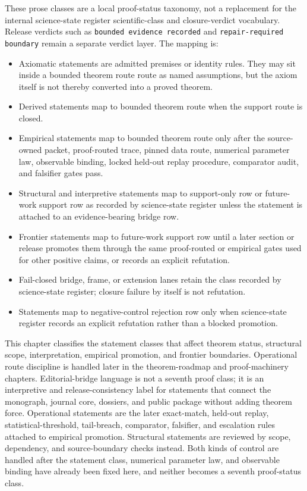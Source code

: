 These prose classes are a local proof-status taxonomy, not a replacement for
the internal science-state register scientific-class and closure-verdict vocabulary. Release
verdicts such as \texttt{bounded evidence recorded} and \texttt{repair-required boundary} remain a separate
verdict layer. The mapping is:
\begin{itemize}
\item Axiomatic statements are admitted premises or identity rules. They may
      sit inside a bounded theorem route route as named assumptions, but
      the axiom itself is not thereby converted into a proved theorem.
\item Derived statements map to bounded theorem route when the support
      route is closed.
\item Empirical statements map to bounded theorem route only after the
      source-owned packet, proof-routed trace, pinned data route, numerical
      parameter law, observable binding, locked held-out replay procedure,
      comparator audit, and falsifier gates pass.
\item Structural and interpretive statements map to support-only row or
      future-work support row as recorded by science-state register unless the statement is attached
      to an evidence-bearing bridge row.
\item Frontier statements map to future-work support row until a later section or
      release promotes them through the same proof-routed or empirical gates
      used for other positive claims, or records an explicit refutation.
\item Fail-closed bridge, frame, or extension lanes retain the class recorded
      by science-state register; closure failure by itself is not refutation.
\item Statements map to negative-control rejection row only when science-state register records an explicit
      refutation rather than a blocked promotion.
\end{itemize}
This chapter classifies the statement classes that affect theorem status,
structural scope, interpretation, empirical promotion, and frontier boundaries.
Operational route discipline is handled later in the theorem-roadmap and
proof-machinery chapters.
Editorial-bridge language is not a seventh proof class; it is an interpretive
and release-consistency label for statements that connect the monograph,
journal core, dossiers, and public package without adding theorem force.
Operational statements are the later exact-match, held-out replay,
statistical-threshold, tail-breach, comparator, falsifier, and escalation
rules attached to empirical promotion. Structural statements are reviewed by
scope, dependency, and source-boundary checks instead. Both kinds of control
are handled after the statement class, numerical parameter law, and observable
binding have already been fixed here, and neither becomes a seventh
proof-status class.

